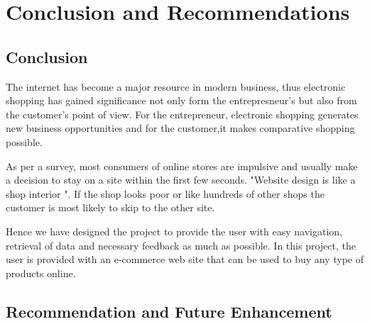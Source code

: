 \chapter{Conclusion and Recommendations}

\section{Conclusion}
The internet has become a major resource in modern business, thus electronic shopping has gained significance not only form the entrepresneur's but also from the customer's point of view. For the entrepreneur, electronic shopping generates new business opportunities and for the customer,it makes comparative shopping possible.

As per a survey, most consumers of online stores are impulsive and usually make a decision to stay on a site within the first few seconds. "Website design is like a shop interior ". If the shop looks poor or like hundreds of other shops the customer is most likely to skip to the other site.

Hence we have designed the project to provide the user with easy navigation, retrieval of data and necessary feedback as much as possible. In this project, the user is provided with an e-commerce web site that can be used to buy any type of products online.



\section{Recommendation and Future Enhancement}


 	
